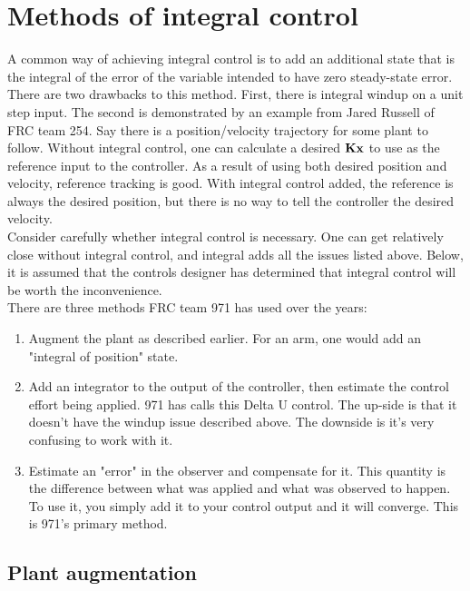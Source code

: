 \chapter{Methods of integral control} \label{ch:integral-control}

A common way of achieving integral control is to add an additional state that is
the integral of the error of the variable intended to have zero steady-state
error. \\

There are two drawbacks to this method. First, there is integral windup on a
unit step input. The second is demonstrated by an example from Jared Russell of
FRC team 254. Say there is a position/velocity trajectory for some plant to
follow. Without integral control, one can calculate a desired $\mathbf{K}\mathbf{x}$
to use as the reference input to the controller. As a result of using both
desired position and velocity, reference tracking is good. With integral control
added, the reference is always the desired position, but there is no way to tell
the controller the desired velocity. \\

Consider carefully whether integral control is necessary. One can get relatively
close without integral control, and integral adds all the issues listed above.
Below, it is assumed that the controls designer has determined that integral
control will be worth the inconvenience. \\

There are three methods FRC team 971 has used over the years:

\begin{enumerate}
  \item Augment the plant as described earlier. For an arm, one would add an
    "integral of position" state.
  \item Add an integrator to the output of the controller, then estimate the
    control effort being applied. 971 has calls this Delta U control. The
    up-side is that it doesn't have the windup issue described above. The
    downside is it's very confusing to work with it.
  \item Estimate an "error" in the observer and compensate for it. This quantity
    is the difference between what was applied and what was observed to happen.
    To use it, you simply add it to your control output and it will converge.
    This is 971's primary method.
\end{enumerate}

\section{Plant augmentation}

